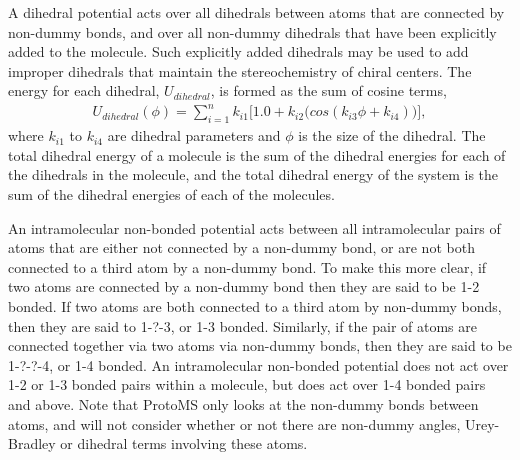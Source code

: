 \documentclass[letterpaper,10pt,english]{sphinxmanual}
\begin{document}
\ignorespaces 
{}

A dihedral potential acts over all dihedrals between atoms that are connected by non-dummy bonds, and over all non-dummy dihedrals that have been explicitly added to the molecule. Such explicitly added dihedrals may be used to add improper dihedrals that maintain the stereochemistry of chiral centers. The energy for each dihedral, \(U_{dihedral}\), is formed as the sum of  cosine terms,
\begin{equation}\label{equation:protoms:dihepot}
\begin{split}U_{dihedral}(\phi) = \sum_{i=1}^{n} k_{i1}\bigl[1.0 + k_{i2}\bigl(cos(k_{i3}\phi + k_{i4})\bigr)\bigr],\end{split}
\end{equation}
where \(k_{i1}\) to \(k_{i4}\) are dihedral parameters and \(\phi\) is the size of the dihedral. The total dihedral energy of a molecule is the sum of the dihedral energies for each of the dihedrals in the molecule, and the total dihedral energy of the system is the sum of the dihedral energies of each of the molecules.

\ignorespaces 
{}

An intramolecular non-bonded potential acts between all intramolecular pairs of atoms that are either not connected by a non-dummy bond, or are not both connected to a third atom by a non-dummy bond. To make this more clear, if two atoms are connected by a non-dummy bond then they are said to be 1-2 bonded. If two atoms are both connected to a third atom by non-dummy bonds, then they are said to 1-?-3, or 1-3 bonded. Similarly, if the pair of atoms are connected together via two atoms via non-dummy bonds, then they are said to be 1-?-?-4, or 1-4 bonded. An intramolecular non-bonded potential does not act over 1-2 or 1-3 bonded pairs within a molecule, but does act over 1-4 bonded pairs and above. Note that ProtoMS only looks at the non-dummy bonds between atoms, and will not consider whether or not there are non-dummy angles, Urey-Bradley or dihedral terms involving these atoms.
\end{document}
